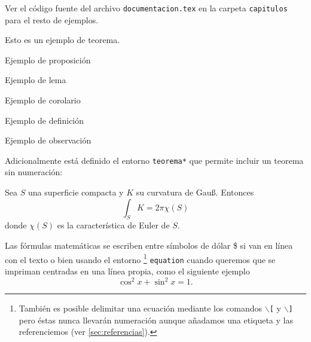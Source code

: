 Ver el código fuente del archivo \texttt{documentacion.tex} en la carpeta \texttt{capitulos} para el resto de ejemplos.

\begin{teorema}\label{thm:teorema}
  Esto es un ejemplo de teorema.
\end{teorema}

\begin{proposicion}\label{prop:proposicion}
  Ejemplo de proposición
\end{proposicion}

\begin{lema}\label{lem:lema}
  Ejemplo de lema
\end{lema}

\begin{corolario}\label{cor:corolario}
  Ejemplo de corolario
\end{corolario}

\begin{definicion}\label{def:definicion}
  Ejemplo de definición
\end{definicion}

\begin{observacion}\label{obs:observacion}
  Ejemplo de observación
\end{observacion}

Adicionalmente está definido el entorno \texttt{teorema*} que permite incluir un teorema sin numeración:

\begin{teorema*}
  Sea $S$ una superficie compacta y $K$ su curvatura de Gauß. Entonces
  \begin{equation}
    \int_S K = 2\pi\chi(S)
  \end{equation}
  donde $\chi(S)$ es la característica de Euler de $S$.
\end{teorema*}

Las fórmulas matemáticas se escriben entre símbolos de dólar \$ si van en línea con el texto o bien usando el entorno%
\footnote{
  También es posible delimitar una ecuación mediante los comandos \texttt{$\backslash$[} y \texttt{$\backslash$]} pero éstas nunca llevarán numeración aunque añadamos una etiqueta y las referenciemos (ver \autoref{sec:referencias}).
}
\texttt{equation} cuando queremos que se impriman centradas en una línea propia, como el siguiente ejemplo
\begin{equation}\label{eq:identidad-pitagorica}
  \cos^2 x + \sin^2 x = 1.
\end{equation}

